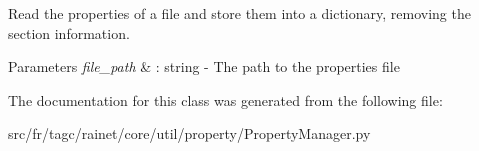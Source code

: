 Read the properties of a file and store them into a dictionary, removing the section information. 


\begin{DoxyParams}{Parameters}
{\em file\-\_\-path} & \-: string -\/ The path to the properties file \\
\hline
\end{DoxyParams}


The documentation for this class was generated from the following file\-:\begin{DoxyCompactItemize}
\item 
src/fr/tagc/rainet/core/util/property/Property\-Manager.\-py\end{DoxyCompactItemize}
